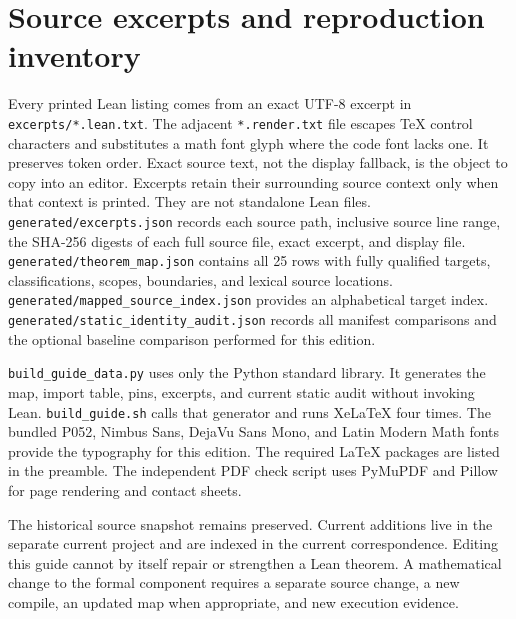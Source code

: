 \documentclass[11pt,a4paper]{article}
\newcommand{\code}[1]{\nolinkurl{#1}}
\begin{document}
\section{Source excerpts and reproduction inventory}\label{app:inventory}
Every printed Lean listing comes from an exact UTF-8 excerpt in \code{excerpts/*.lean.txt}. The adjacent \code{*.render.txt} file escapes TeX control characters and substitutes a math font glyph where the code font lacks one. It preserves token order. Exact source text, not the display fallback, is the object to copy into an editor. Excerpts retain their surrounding source context only when that context is printed. They are not standalone Lean files.
\code{generated/excerpts.json} records each source path, inclusive source line range, the SHA-256 digests of each full source file, exact excerpt, and display file. \code{generated/theorem_map.json} contains all 25 rows with fully qualified targets, classifications, scopes, boundaries, and lexical source locations. \code{generated/mapped_source_index.json} provides an alphabetical target index. \code{generated/static_identity_audit.json} records all manifest comparisons and the optional baseline comparison performed for this edition.

\code{build_guide_data.py} uses only the Python standard library. It generates the map, import table, pins, excerpts, and current static audit without invoking Lean. \code{build_guide.sh} calls that generator and runs XeLaTeX four times. The bundled P052, Nimbus Sans, DejaVu Sans Mono, and Latin Modern Math fonts provide the typography for this edition. The required LaTeX packages are listed in the preamble. The independent PDF check script uses PyMuPDF and Pillow for page rendering and contact sheets.

The historical source snapshot remains preserved. Current additions live in the separate current project and are indexed in the current correspondence. Editing this guide cannot by itself repair or strengthen a Lean theorem. A mathematical change to the formal component requires a separate source change, a new compile, an updated map when appropriate, and new execution evidence.
\end{document}
